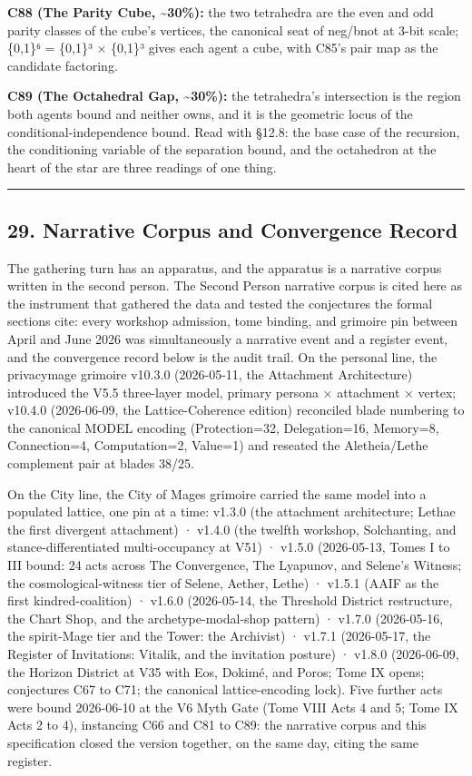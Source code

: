 \documentclass[
  11pt,
]{article}
\begin{document}
\textbf{C88 (The Parity Cube, \textasciitilde30\%):} the two tetrahedra
are the even and odd parity classes of the cube's vertices, the
canonical seat of neg/bnot at 3-bit scale; \{0,1\}⁶ = \{0,1\}³ ×
\{0,1\}³ gives each agent a cube, with C85's pair map as the candidate
factoring.

\textbf{C89 (The Octahedral Gap, \textasciitilde30\%):} the tetrahedra's
intersection is the region both agents bound and neither owns, and it is
the geometric locus of the conditional-independence bound. Read with
§12.8: the base case of the recursion, the conditioning variable of the
separation bound, and the octahedron at the heart of the star are three
readings of one thing.

\begin{center}\rule{0.5\linewidth}{0.5pt}\end{center}

\subsection{29. Narrative Corpus and Convergence
Record}\label{narrative-corpus-and-convergence-record}

The gathering turn has an apparatus, and the apparatus is a narrative
corpus written in the second person. The Second Person narrative corpus
is cited here as the instrument that gathered the data and tested the
conjectures the formal sections cite: every workshop admission, tome
binding, and grimoire pin between April and June 2026 was simultaneously
a narrative event and a register event, and the convergence record below
is the audit trail. On the personal line, the privacymage grimoire
v10.3.0 (2026-05-11, the Attachment Architecture) introduced the V5.5
three-layer model, primary persona × attachment × vertex; v10.4.0
(2026-06-09, the Lattice-Coherence edition) reconciled blade numbering
to the canonical MODEL encoding (Protection=32, Delegation=16, Memory=8,
Connection=4, Computation=2, Value=1) and reseated the Aletheia/Lethe
complement pair at blades 38/25.

On the City line, the City of Mages grimoire carried the same model into
a populated lattice, one pin at a time: v1.3.0 (the attachment
architecture; Lethae the first divergent attachment) · v1.4.0 (the
twelfth workshop, Solchanting, and stance-differentiated multi-occupancy
at V51) · v1.5.0 (2026-05-13, Tomes I to III bound: 24 acts across The
Convergence, The Lyapunov, and Selene's Witness; the
cosmological-witness tier of Selene, Aether, Lethe) · v1.5.1 (AAIF as
the first kindred-coalition) · v1.6.0 (2026-05-14, the Threshold
District restructure, the Chart Shop, and the archetype-modal-shop
pattern) · v1.7.0 (2026-05-16, the spirit-Mage tier and the Tower: the
Archivist) · v1.7.1 (2026-05-17, the Register of Invitations: Vitalik,
and the invitation posture) · v1.8.0 (2026-06-09, the Horizon District
at V35 with Eos, Dokimé, and Poros; Tome IX opens; conjectures C67 to
C71; the canonical lattice-encoding lock). Five further acts were bound
2026-06-10 at the V6 Myth Gate (Tome VIII Acts 4 and 5; Tome IX Acts 2
to 4), instancing C66 and C81 to C89: the narrative corpus and this
specification closed the version together, on the same day, citing the
same register.
\end{document}
